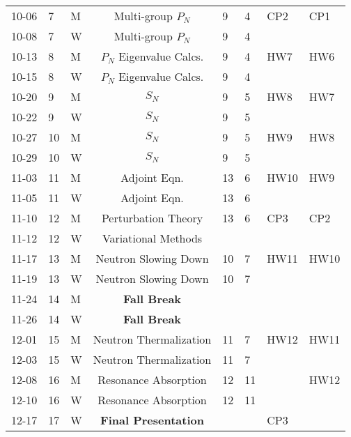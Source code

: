 \documentclass[11pt, a4paper]{article}
\begin{document}
\begin{table}[h]
\begin{center}
\begin{tabular}{lllcllll}
10-06 & 7 & M  & Multi-group $P_N$       & 9    & 4    & CP2 & CP1 \\
10-08 & 7 & W  & Multi-group $P_N$       & 9    & 4    &     &     \\
10-13 & 8 & M  & $P_N$ Eigenvalue Calcs. & 9    & 4    & HW7 & HW6 \\
10-15 & 8 & W  & $P_N$ Eigenvalue Calcs. & 9    & 4    &     &     \\
10-20 & 9 & M  & $S_N$                   & 9    & 5    & HW8 & HW7 \\
10-22 & 9 & W  & $S_N$                   & 9    & 5    &     &     \\
10-27 & 10 & M & $S_N$                   & 9    & 5    & HW9 & HW8 \\
10-29 & 10 & W & $S_N$                   & 9    & 5    &     &     \\
11-03 & 11 & M & Adjoint Eqn.            & 13   & 6    & HW10& HW9 \\
11-05 & 11 & W & Adjoint Eqn.            & 13   & 6    &     &     \\
11-10 & 12 & M & Perturbation Theory     & 13   & 6    & CP3 & CP2 \\
11-12 & 12 & W & Variational Methods     &      &      &     &     \\
11-17 & 13 & M & Neutron Slowing Down    & 10   & 7    & HW11& HW10\\
11-19 & 13 & W & Neutron Slowing Down    & 10   & 7    &     &     \\
11-24 & 14 & M & \textbf{Fall Break}     &      &      &     &     \\
11-26 & 14 & W & \textbf{Fall Break}     &      &      &     &     \\
12-01 & 15 & M & Neutron Thermalization  & 11   & 7    & HW12& HW11\\
12-03 & 15 & W & Neutron Thermalization  & 11   & 7    &     &     \\
12-08 & 16 & M & Resonance Absorption    & 12   & 11   &     & HW12\\
12-10 & 16 & W & Resonance Absorption    & 12   & 11   &     &     \\
12-17 & 17 & W & \textbf{Final Presentation} &  &      & CP3 &     \\
\end{tabular}
\end{center}
\end{table}
\end{document}
